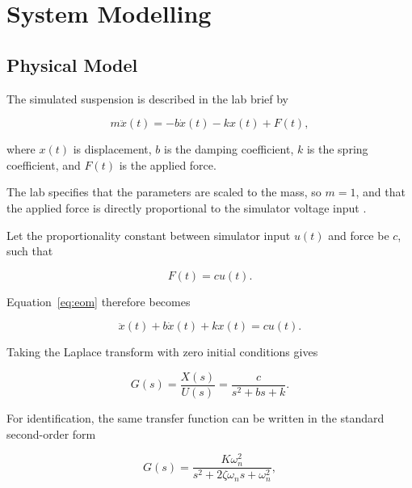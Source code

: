 \documentclass[12pt,a4paper]{article}
\begin{document}
\section{System Modelling}
\label{sec:model}

\subsection{Physical Model}

The simulated suspension is described in the lab brief by

\begin{equation}
    m\ddot{x}(t)
    =
    -b\dot{x}(t)
    -kx(t)
    +F(t),
    \label{eq:eom}
\end{equation}

where $x(t)$ is displacement, $b$ is the damping coefficient,
$k$ is the spring coefficient, and $F(t)$ is the applied force.

The lab specifies that the parameters are scaled to the mass, so
$m=1$, and that the applied force is directly proportional to the
simulator voltage input \cite{labbrief}.

Let the proportionality constant between simulator input $u(t)$
and force be $c$, such that

\begin{equation}
    F(t)=cu(t).
\end{equation}

Equation~\eqref{eq:eom} therefore becomes

\begin{equation}
    \ddot{x}(t)
    +
    b\dot{x}(t)
    +
    kx(t)
    =
    cu(t).
\end{equation}

Taking the Laplace transform with zero initial conditions gives

\begin{equation}
    G(s)
    =
    \frac{X(s)}{U(s)}
    =
    \frac{c}{s^2+bs+k}.
    \label{eq:physical_tf}
\end{equation}

For identification, the same transfer function can be written in
the standard second-order form

\begin{equation}
    G(s)
    =
    \frac{K\omega_n^2}
    {s^2+2\zeta\omega_n s+\omega_n^2},
    \label{eq:second_order}
\end{equation}
\end{document}

